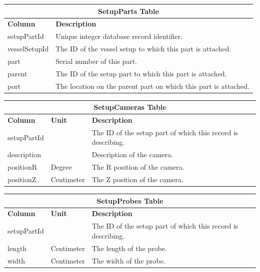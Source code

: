 \begin{table}[h!]
\centering
\begin{tabular}{l p{12cm}}
\multicolumn{2}{c}{\bf SetupParts Table} \\ \hline
{\bf Column} & {\bf Description}\\ \hline
setupPartId & Unique integer database record identifier.\\ \hline
vesselSetupId & The ID of the vessel setup to which this part is attached.\\ \hline
part & Serial number of this part.\\ \hline
parent & The ID of the setup part to which this part is attached.\\ \hline
port & The location on the parent part on which this part is attached.\\ \hline
\end{tabular}
\end{table}

\begin{table}[h!]
\centering
\begin{tabular}{l l p{10.3cm}}
\multicolumn{3}{c}{\bf SetupCameras Table} \\ \hline
{\bf Column} & {\bf Unit} & {\bf Description}\\ \hline
setupPartId & & The ID of the setup part of which this record is describing.\\ \hline
description & & Description of the camera.\\ \hline
positionR & Degree & The R position of the camera.\\ \hline
positionZ & Centimeter & The Z position of the camera.\\ \hline
\end{tabular}
\end{table}

\begin{table}[h!]
\centering
\begin{tabular}{l l p{10.3cm}}
\multicolumn{3}{c}{\bf SetupProbes Table} \\ \hline
{\bf Column} & {\bf Unit} & {\bf Description}\\ \hline
setupPartId & & The ID of the setup part of which this record is describing.\\ \hline
length & Centimeter & The length of the probe.\\ \hline
width & Centimeter & The width of the probe.\\ \hline
\end{tabular}
\end{table}

